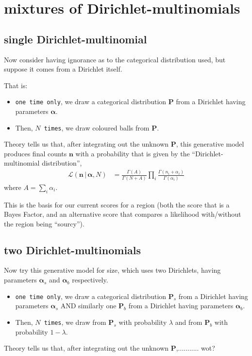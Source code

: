 \documentclass[11pt]{article}
\newcommand{\given}{\,|\,}
\begin{document}
\section{mixtures of Dirichlet-multinomials}

\subsection{single Dirichlet-multinomial}

Now consider having ignorance as to the categorical distribution used, but suppose it comes from a Dirichlet itself.

That is: 
\begin{itemize}
\item
{\tt one time only}, we draw a categorical distribution $\mathbf{P}$
from a Dirichlet having parameters $\boldsymbol\alpha$.

\item 
Then, {\tt $N$ times}, we draw coloured balls from $\mathbf{P}$.
\end{itemize}

Theory tells us that, after integrating out the unknown $\mathbf{P}$,
this generative model produces final counts $\mathbf{n}$ with  a probability
that is given by the ``Dirichlet-multinomial distribution'',
\begin{align}
\mathcal{L}(\mathbf{n} \given \boldsymbol\alpha, N) &= \frac{\Gamma(A)}{\Gamma(N+A)} \prod_i \frac{\Gamma(n_i + \alpha_i)}{\Gamma(\alpha_i)}
\end{align}
where $A = \sum_i \alpha_i$.

This is the basis for our current scores for a region (both the score
that is a Bayes Factor, and an alternative score that compares a
likelihood with/without the region being ``sourcy'').

\subsection{two Dirichlet-multinomials}

Now try this generative model for size, which uses two Dirichlets, having parameters $\boldsymbol\alpha_s$ and $\boldsymbol\alpha_b$ respectively.

\begin{itemize}
\item
{\tt one time only}, we draw a categorical distribution $\mathbf{P}_s$
from a Dirichlet having parameters $\boldsymbol\alpha_s$ AND similarly
one $\mathbf{P}_b$ from a Dirichlet having parameters
$\boldsymbol\alpha_b$.

\item
Then, {\tt $N$ times}, 
we draw from $\mathbf{P}_s$ with probability $\lambda$ and from $\mathbf{P}_b$ with probability $1-\lambda$. 
\end{itemize}

Theory tells us that, after integrating out the unknown $\mathbf{P}$,........... wot?
\end{document}
